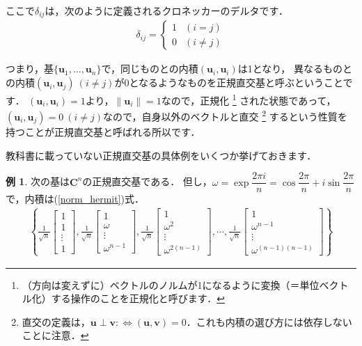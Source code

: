 \documentclass[dvipdfmx]{jsarticle}
\theoremstyle{definition}
\newtheorem{example}[definition]{例}
\begin{document}
ここで$\delta_{ij}$は，次のように定義されるクロネッカーのデルタです．
\begin{align*}
    \delta_{ij} =
    \begin{cases}
        1 & (i = j) \\
        0 & (i \neq j)
    \end{cases}
\end{align*}

つまり，基$\{ \bm{u}_1, \ldots, \bm{u}_n \}$で，同じものとの内積$(\bm{u}_i, \bm{u}_i)$は1となり，
異なるものとの内積$(\bm{u}_i, \bm{u}_j) \ (i \neq j)$が0となるようなものを正規直交基と呼ぶということです．
$(\bm{u}_i, \bm{u}_i) = 1$より，$\| \bm{u}_i \| = 1$なので，正規化
\footnote{（方向は変えずに）ベクトルのノルムが1になるように変換（＝単位ベクトル化）する操作のことを正規化と呼びます．}
された状態であって，$(\bm{u}_i, \bm{u}_j) = 0 \ (i \neq j)$なので，自身以外のベクトルと直交
\footnote{直交の定義は，$\bm{u} \perp \bm{v} :\Longleftrightarrow (\bm{u}, \bm{v}) = 0$．これも内積の選び方には依存しないことに注意．}
するという性質を持つことが正規直交基と呼ばれる所以です．

教科書に載っていない正規直交基の具体例をいくつか挙げておきます．

\begin{example}
    次の基は$\bm{C}^n$の正規直交基である．
    但し，$\omega = \exp{\dfrac{2\pi i}{n}} = \cos{\dfrac{2\pi}{n}} + i \sin{\dfrac{2\pi}{n}}$で，内積は(\ref{norm_hermit})式．
    \begin{align*}
        \left\{
            \frac{1}{\sqrt{n}} \begin{bmatrix} 1 \\ 1 \\ \vdots \\ 1 \end{bmatrix} ,
            \frac{1}{\sqrt{n}} \begin{bmatrix} 1 \\ \omega \\ \vdots \\ \omega^{n-1} \end{bmatrix} ,
            \frac{1}{\sqrt{n}} \begin{bmatrix} 1 \\ \omega^2 \\ \vdots \\ \omega^{2(n-1)} \end{bmatrix} ,
            \cdots ,
            \frac{1}{\sqrt{n}} \begin{bmatrix} 1 \\ \omega^{n-1} \\ \vdots \\ \omega^{(n-1)(n-1)} \end{bmatrix}
        \right\}
    \end{align*}
\end{example}
\end{document}

